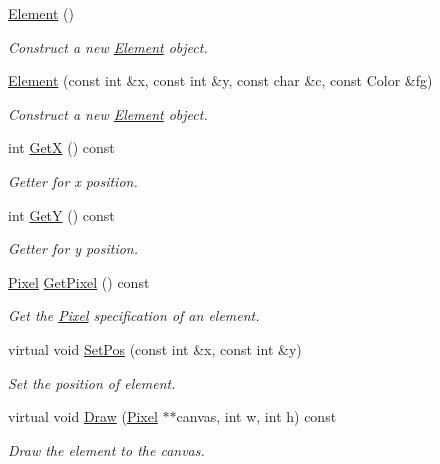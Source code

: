 \begin{DoxyCompactItemize}
\item 
\mbox{\label{classUI_1_1Element_a6e89c076f1b65475d2a10529d98f6aab}} 
\hyperlink{classUI_1_1Element_a6e89c076f1b65475d2a10529d98f6aab}{Element} ()
\begin{DoxyCompactList}\small\item\em Construct a new \hyperlink{classUI_1_1Element}{Element} object. \end{DoxyCompactList}\item 
\hyperlink{classUI_1_1Element_ad8748432459e26a90db62d2ded032fae}{Element} (const int \&x, const int \&y, const char \&c, const Color \&fg)
\begin{DoxyCompactList}\small\item\em Construct a new \hyperlink{classUI_1_1Element}{Element} object. \end{DoxyCompactList}\item 
int \hyperlink{classUI_1_1Element_aa74cd15956eed3d625e57f4f30137165}{GetX} () const
\begin{DoxyCompactList}\small\item\em Getter for x position. \end{DoxyCompactList}\item 
int \hyperlink{classUI_1_1Element_a9f205e4c3ad7f35cf4a10b54a9dc858c}{GetY} () const
\begin{DoxyCompactList}\small\item\em Getter for y position. \end{DoxyCompactList}\item 
\hyperlink{classUI_1_1Pixel}{Pixel} \hyperlink{classUI_1_1Element_a7137dc641804612162488d32a147c229}{Get\+Pixel} () const
\begin{DoxyCompactList}\small\item\em Get the \hyperlink{classUI_1_1Pixel}{Pixel} specification of an element. \end{DoxyCompactList}\item 
virtual void \hyperlink{classUI_1_1Element_ad2c9488af2a35976f55216ac2baa5c48}{Set\+Pos} (const int \&x, const int \&y)
\begin{DoxyCompactList}\small\item\em Set the position of element. \end{DoxyCompactList}\item 
virtual void \hyperlink{classUI_1_1Element_a9ab0431501f219b3bf81c8bfe71ab3ee}{Draw} (\hyperlink{classUI_1_1Pixel}{Pixel} $\ast$$\ast$canvas, int w, int h) const
\begin{DoxyCompactList}\small\item\em Draw the element to the canvas. \end{DoxyCompactList}\end{DoxyCompactItemize}
